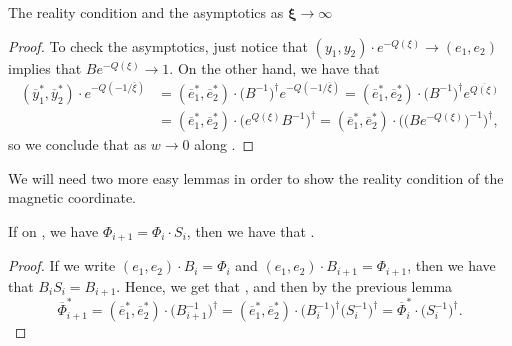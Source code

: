 \begin{subsubsection}{The reality condition and the asymptotics as $\boldsymbol{\xi \to \infty}$}
\begin{proof}
To check the asymptotics, just notice that $(y_1,y_2)\cdot e^{-Q(\xi)} \to (e_1,e_2)$ implies that $Be^{-Q(\xi)}\to 1$. On the other hand, we have that
\begin{align*}
 (\overline{y}_1^{*},\overline{y}_2^{*})\cdot e^{-Q(-1/\overline{\xi})}&=(\overline{e}_1^*,\overline{e}_2^*)\cdot \bigl(B^{-1}\bigr)^{\dagger}e^{-Q(-1/\overline{\xi})}=(\overline{e}_1^*,\overline{e}_2^*)\cdot \bigl(B^{-1}\bigr)^{\dagger}e^{\overline{Q(\xi)}}\\
 &=(\overline{e}_1^*,\overline{e}_2^*)\cdot \bigl(e^{Q(\xi)}B^{-1}\bigr)^{\dagger}=(\overline{e}_1^*,\overline{e}_2^*)\cdot \bigl(\bigl(Be^{-Q(\xi)}\bigr)^{-1}\bigr)^{\dagger},
\end{align*}
so we conclude that  as $w\to 0$ along .
\end{proof}

 We will need two more easy lemmas in order to show the reality condition of the magnetic coordinate.

 \begin{Lemma}
 If on , we have $\Phi_{i+1}\!=\!\Phi_i \cdot S_i$, then we have that .
 \end{Lemma}

 \begin{proof}
 If we write $(e_1,e_2)\cdot B_i=\Phi_i$ and $(e_1,e_2)\cdot B_{i+1}=\Phi_{i+1}$, then we have that $B_iS_i=B_{i+1}$. Hence, we get that , and then by the previous lemma
 \begin{equation*}
 \overline{\Phi}_{i+1}^{*}=(\overline{e}_1^*,\overline{e}_2^*)\cdot \bigl(B_{i+1}^{-1}\bigr)^{\dagger}=(\overline{e}_1^*,\overline{e}_2^*)\cdot \bigl(B_i^{-1}\bigr)^{\dagger}\bigl(S_i^{-1}\bigr)^{\dagger}=\overline{\Phi}_{i}^{*}\cdot\bigl(S_i^{-1}\bigr)^{\dagger}.\tag*{\qed}
 \end{equation*}\renewcommand{\qed}{}
 \end{proof}


\end{subsubsection}
